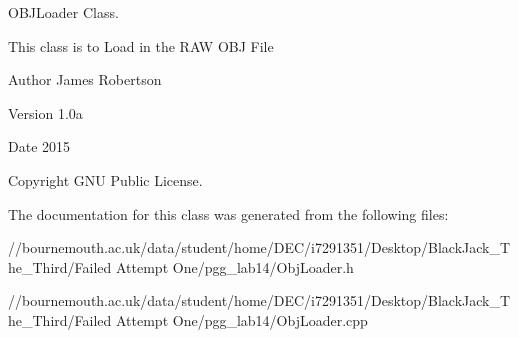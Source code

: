 O\+B\+J\+Loader Class. 

This class is to Load in the R\+A\+W O\+B\+J File \begin{DoxyAuthor}{Author}
James Robertson 
\end{DoxyAuthor}
\begin{DoxyVersion}{Version}
1.\+0a 
\end{DoxyVersion}
\begin{DoxyDate}{Date}
2015 
\end{DoxyDate}
\begin{DoxyCopyright}{Copyright}
G\+N\+U Public License. 
\end{DoxyCopyright}


The documentation for this class was generated from the following files\+:\begin{DoxyCompactItemize}
\item 
//bournemouth.\+ac.\+uk/data/student/home/\+D\+E\+C/i7291351/\+Desktop/\+Black\+Jack\+\_\+\+The\+\_\+\+Third/\+Failed Attempt One/pgg\+\_\+lab14/Obj\+Loader.\+h\item 
//bournemouth.\+ac.\+uk/data/student/home/\+D\+E\+C/i7291351/\+Desktop/\+Black\+Jack\+\_\+\+The\+\_\+\+Third/\+Failed Attempt One/pgg\+\_\+lab14/Obj\+Loader.\+cpp\end{DoxyCompactItemize}
